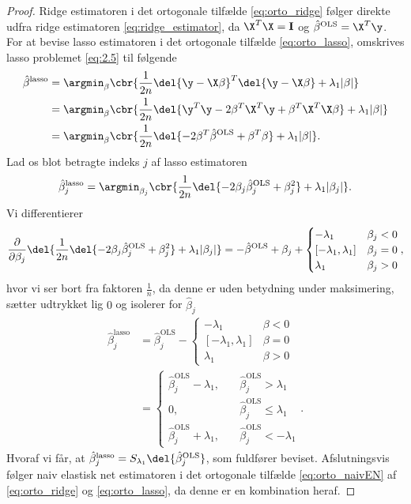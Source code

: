 \begin{proof}
Ridge estimatoren i det ortogonale tilfælde \eqref{eq:orto_ridge} følger direkte udfra ridge estimatoren \eqref{eq:ridge_estimator}, da \(\X^T \X = \mathbf{I}\) og \(\hat{\beta}^\text{OLS} = \X^T \y\).
For at bevise lasso estimatoren i det ortogonale tilfælde \eqref{eq:orto_lasso}, omskrives lasso problemet \eqref{eq:2.5} til følgende
\begin{align*}
\hat{\beta}^\text{lasso} &= \argmin_{\beta} \cbr{\frac{1}{2n} \del{\y - \X \beta}^T \del{\y - \X \beta} + \lambda_1 \vert \beta \vert} \\
&= \argmin_{\beta} \cbr{\frac{1}{2n} \del{\y^T \y - 2 \beta^T \X^T \y + \beta^T \X^T \X \beta} + \lambda_1 \vert \beta \vert} \\
&= \argmin_{\beta} \cbr{\frac{1}{2n} \del{ - 2 \beta^T \hat{\beta}^\text{OLS} + \beta^T \beta} + \lambda_1 \vert \beta \vert}.
\end{align*}
Lad os blot betragte indeks \(j\) af lasso estimatoren
\begin{align*}
\hat{\beta}_j^\text{lasso} = \argmin_{\beta_j} \cbr{\frac{1}{2n} \del{ - 2 \beta_j \hat{\beta}_j^\text{OLS} + \beta_j^2} + \lambda_1 \vert \beta_j \vert}.
\end{align*}
Vi differentierer
\begin{align*}
\frac{\partial}{\partial \beta_j} \del{\frac{1}{2n} \del{ - 2 \beta_j \hat{\beta}_j^\text{OLS} + \beta_j^2} + \lambda_1 \vert \beta_j \vert}
=-\hat{\beta}^\text{OLS} + \beta_j + \begin{cases}
-\lambda_1 \quad &\beta_j < 0 \\
[-\lambda_1, \lambda_1] & \beta_j = 0 \\
\lambda_1 & \beta_j >0 
\end{cases},
\end{align*}
hvor vi ser bort fra faktoren \(\frac{1}{n}\), da denne er uden betydning under maksimering, sætter udtrykket lig \(0\) og isolerer for \(\hat{\beta}_j\)
\begin{align*}
\hat{\beta}_j^\text{lasso} &= \hat{\beta}_j^\text{OLS} - \begin{cases}
-\lambda_1 \quad &\beta < 0 \\
[-\lambda_1, \lambda_1] & \beta = 0 \\
\lambda_1 & \beta >0 
\end{cases} \\
&= \begin{cases}
\hat{\beta}_j^\text{OLS} - \lambda_1, \quad &\hat{\beta}_j^\text{OLS} > \lambda_1 \\
0, &\hat{\beta}_j^\text{OLS} \leq \lambda_1 \\
\hat{\beta}_j^\text{OLS} + \lambda_1, \quad &\hat{\beta}_j^\text{OLS} < - \lambda_1
\end{cases}. 
\end{align*}
Hvoraf vi får, at \(\hat{\beta}_j^\text{lasso} = S_{\lambda_1} \del{ \hat{\beta}_j^\text{OLS}} \), som fuldfører beviset.
Afslutningsvis følger naiv elastisk net estimatoren i det ortogonale tilfælde \eqref{eq:orto_naivEN} af \eqref{eq:orto_ridge} og \eqref{eq:orto_lasso}, da denne er en kombination heraf.
\end{proof}
